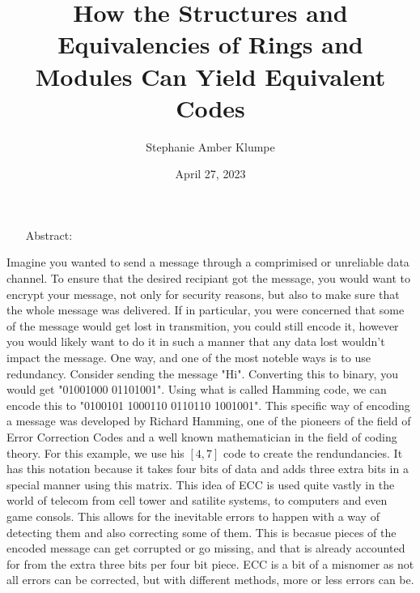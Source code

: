 

\title{How the Structures and Equivalencies of Rings and Modules Can Yield Equivalent Codes}
\author{Stephanie Amber Klumpe}
\date{April 27, 2023}



\maketitle
\newpage

\begin{enumerate}
    \item[Abstract:]  
\end{enumerate}

Imagine you wanted to send a message through a comprimised or unreliable data channel. To ensure that
the desired recipiant got the message, you would want to encrypt your message, not only for security
reasons, but also to make sure that the whole message was delivered. If in particular, you were
concerned that some of the message would get lost in transmition, you could still encode it, however you
would likely want to do it in such a manner that any data lost wouldn't impact the message. One way, and
one of the most noteble ways is to use redundancy. Consider sending the message "Hi". Converting this to
binary, you would get "01001000 01101001". Using what is called Hamming code, we can encode this to
"0100101 1000110 0110110 1001001". This specific way of encoding a message was developed by Richard
Hamming, one of the pioneers of the field of Error Correction Codes and a well known mathematician in
the field of coding theory. For this example, we use his $[4,7]$ code to create the rendundancies. It
has this notation because it takes four bits of data and adds three extra bits in a special manner using
this matrix.
This idea of ECC is used quite vastly in  the world of telecom from cell tower and satilite systems, to
computers and even game consols. This allows for the inevitable errors to happen with a way of detecting
them and also correcting some of them. This is becasue pieces of the encoded message can get corrupted
or go missing, and that is already accounted for from the extra three bits per four bit piece. ECC is a
bit of a misnomer as not all errors can be corrected, but with different methods, more or less errors
can be.\\

